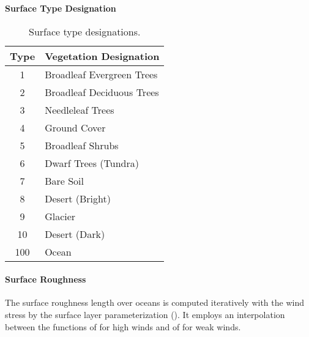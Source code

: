 \begin{table}
\begin{center}
{\bf Surface Type Designation} \\
\vspace{0.1in}
\begin{tabular}{ |c|l| }
\hline
Type & Vegetation Designation \\ \hline
\hline
  1 & Broadleaf Evergreen Trees \\ \hline
  2 & Broadleaf Deciduous Trees \\ \hline
  3 & Needleleaf Trees \\ \hline
  4 & Ground Cover \\ \hline   
  5 & Broadleaf Shrubs \\ \hline
  6 & Dwarf Trees (Tundra) \\ \hline
  7 & Bare Soil \\ \hline
  8 & Desert (Bright) \\ \hline
  9 & Glacier \\ \hline
 10 & Desert (Dark) \\ \hline
100 & Ocean \\ \hline
\end{tabular}
\end{center}
\caption{Surface type designations.}
\label{tab:fizhi:surftype}
\end{table}
 
\begin{figure*}[htbp]
  \centerline{  \epsfysize=4.0in  }
  \vspace{0.2in}
  \caption  {Surface Type Combinations.}
  \label{fig:fizhi:surftype}
\end{figure*}



\paragraph{Surface Roughness}
The surface roughness length over oceans is computed iteratively with the wind
stress by the surface layer parameterization (\cite{helfschu:95}).
It employs an interpolation between the functions of \cite{larpond:81}
for high winds and of \cite{kondo:75} for weak winds.


